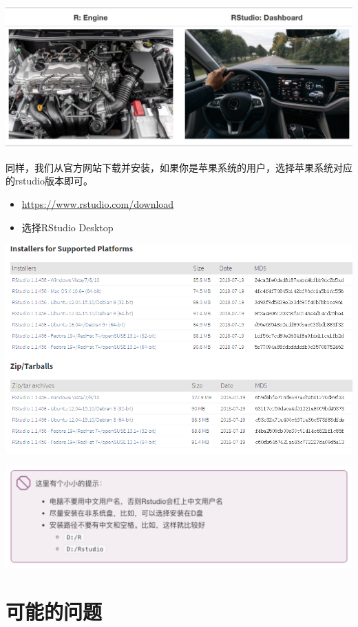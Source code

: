 \documentclass[
]{book}
\providecommand{\tightlist}{%
  \setlength{\itemsep}{0pt}\setlength{\parskip}{0pt}}
\begin{document}
\includegraphics{figure/2.png}

同样，我们从官方网站下载并安装，如果你是苹果系统的用户，选择苹果系统对应的rstudio版本即可。

\begin{itemize}
\tightlist
\item
  \url{https://www.rstudio.com/download}
\item
  选择RStudio Desktop
\end{itemize}

\includegraphics{figure/3.png}

\includegraphics{figure/4.png}

\hypertarget{ux53efux80fdux7684ux95eeux9898}{%
\section*{可能的问题}\label{ux53efux80fdux7684ux95eeux9898}}
\end{document}
